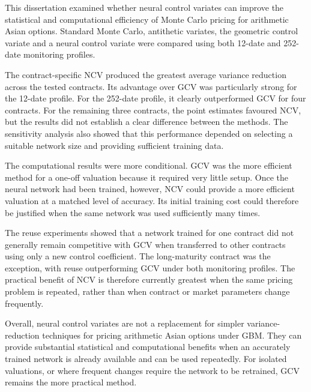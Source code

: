 This dissertation examined whether neural control variates can improve the statistical and computational efficiency of Monte Carlo pricing for arithmetic Asian options. Standard Monte Carlo, antithetic variates, the geometric control variate and a neural control variate were compared using both 12-date and 252-date monitoring profiles.

The contract-specific NCV produced the greatest average variance reduction across the tested contracts. Its advantage over GCV was particularly strong for the 12-date profile. For the 252-date profile, it clearly outperformed GCV for four contracts. For the remaining three contracts, the point estimates favoured NCV, but the results did not establish a clear difference between the methods. The sensitivity analysis also showed that this performance depended on selecting a suitable network size and providing sufficient training data.

The computational results were more conditional. GCV was the more efficient method for a one-off valuation because it required very little setup. Once the neural network had been trained, however, NCV could provide a more efficient valuation at a matched level of accuracy. Its initial training cost could therefore be justified when the same network was used sufficiently many times.

The reuse experiments showed that a network trained for one contract did not generally remain competitive with GCV when transferred to other contracts using only a new control coefficient. The long-maturity contract was the exception, with reuse outperforming GCV under both monitoring profiles. The practical benefit of NCV is therefore currently greatest when the same pricing problem is repeated, rather than when contract or market parameters change frequently.

Overall, neural control variates are not a replacement for simpler variance-reduction techniques for pricing arithmetic Asian options under GBM. They can provide substantial statistical and computational benefits when an accurately trained network is already available and can be used repeatedly. For isolated valuations, or where frequent changes require the network to be retrained, GCV remains the more practical method.
